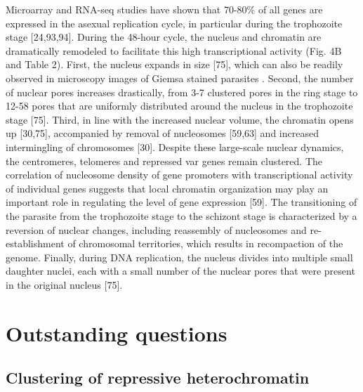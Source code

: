 Microarray and RNA-seq studies have shown that 70-80\% of all genes are
expressed in the asexual replication cycle, in particular during the
trophozoite stage \citep{bunnik:polysome, leroch:discovery, otto:new}
[24,93,94]. During the 48-hour cycle, the nucleus and
chromatin are dramatically remodeled to facilitate this high transcriptional
activity (Fig. 4B and Table 2). First, the nucleus expands in size
\citep{weiner:3D} [75], which
can also be readily observed in microscopy images of Giemsa stained parasites
\citep{ay:three-dimensional}. Second, the number of nuclear pores increases 
drastically, from 3-7
clustered pores in the ring stage to 12-58 pores that are uniformly
distributed around the nucleus in the trophozoite stage \citep{weiner:3D} 
[75]. Third, in line
with the increased nuclear volume, the chromatin opens up
\citep{ay:three-dimensional, weiner:3D} [30,75], accompanied
by removal of nucleosomes \citep{bunnik:DNA-encoded, ponts:nucleosome}
[59,63] and increased intermingling of chromosomes
\citep{ay:three-dimensional} [30]. Despite these large-scale nuclear dynamics, the centromeres, telomeres
and repressed var genes remain clustered. The correlation of nucleosome
density of gene promoters with transcriptional activity of individual genes
suggests that local chromatin organization may play an important role in
regulating the level of gene expression \citep{bunnik:DNA-encoded} [59]. The transitioning of the
parasite from the trophozoite stage to the schizont stage is characterized by
a reversion of nuclear changes, including reassembly of nucleosomes and
re-establishment of chromosomal territories, which results in recompaction of
the genome. Finally, during DNA replication, the nucleus divides into multiple
small daughter nuclei, each with a small number of the nuclear pores that were
present in the original nucleus \citep{weiner:3D} [75].

\section{Outstanding questions}

\subsection{Clustering of repressive heterochromatin}

